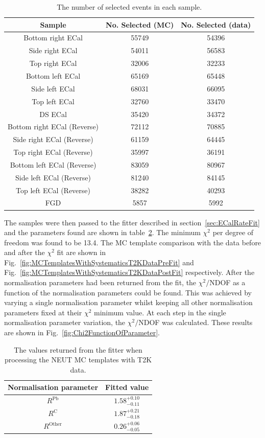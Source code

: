 \begin{table}
  \begin{tabular}{c c c}
    Sample & No. Selected (MC) & No. Selected (data) \\ \hline \hline
   Bottom right ECal & 55749 & 54396 \\
   Side right ECal & 54011 & 56583 \\
   Top right ECal & 32006 & 32233 \\
   Bottom left ECal & 65169 & 65448 \\
   Side left ECal & 68031 & 66095 \\
   Top left ECal & 32760 & 33470 \\
   DS ECal & 35420 & 34372 \\
   Bottom right ECal (Reverse) & 72112 & 70885 \\
   Side right ECal (Reverse) & 61159 & 64445 \\
   Top right ECal (Reverse) & 35997 & 36191 \\
   Bottom left ECal (Reverse) & 83059 & 80967 \\
   Side left ECal (Reverse) & 81240 & 84145 \\
   Top left ECal (Reverse) & 38282 & 40293 \\
   FGD & 5857 & 5992 \\
  \end{tabular}
  \caption{The number of selected events in each sample.}
  \label{table:NSelectedEventsMCDataAllSamples}
\end{table}
\newline
\newline
The samples were then passed to the fitter described in section~\ref{sec:ECalRateFit} and the parameters found are shown in table~\ref{table:NEUTMCTemplatesT2KDataFitParameters}.  The minimum $\chi^2$ per degree of freedom was found to be 13.4.  The MC template comparison with the data before and after the $\chi^2$ fit are shown in Fig.~\ref{fig:MCTemplatesWithSystematicsT2KDataPreFit} and Fig.~\ref{fig:MCTemplatesWithSystematicsT2KDataPostFit} respectively.  After the normalisation parameters had been returned from the fit, the $\chi^2/$NDOF as a function of the normalisation parameters could be found.  This was achieved by varying a single normalisation parameter whilst keeping all other normalisation parameters fixed at their $\chi^2$ minimum value.  At each step in the single normalisation parameter variation, the $\chi^2/$NDOF was calculated.  These results are shown in Fig.~\ref{fig:Chi2FunctionOfParameter}.
\begin{table}
  \begin{tabular}{c c }
    Normalisation parameter & Fitted value \\ \hline \hline
    $R^{\textrm{Pb}}$ & $1.58^{+0.10}_{-0.11}$  \\
    $R^{\textrm{C}}$ & $1.87^{+0.21}_{-0.18}$  \\
    $R^{\textrm{Other}}$ & $0.26^{+0.06}_{-0.05}$  \\
  \end{tabular}
  \caption{The values returned from the fitter when processing the NEUT MC templates with T2K data.}
  \label{table:NEUTMCTemplatesT2KDataFitParameters}
\end{table}
